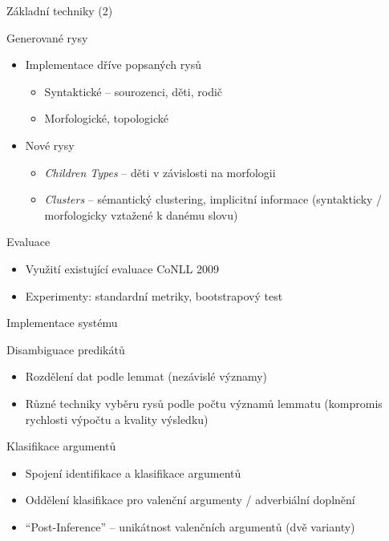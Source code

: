\documentclass[hyperref={unicode=true}]{beamer}
\begin{document}
\begin{frame}{Základní techniky (2)}
    \begin{block}{Generované rysy}
    \begin{itemize}
        \item Implementace dříve popsaných rysů
        \begin{itemize}
            \item Syntaktické -- sourozenci, děti, rodič
            \item Morfologické, topologické
        \end{itemize}
        \item Nové rysy
        \begin{itemize}
            \item \emph{Children Types} -- děti v závislosti na morfologii
            \item \emph{Clusters} -- sémantický clustering, implicitní informace (syntakticky / morfologicky vztažené k danému slovu)
        \end{itemize}
    \end{itemize}
    \end{block}

    \begin{block}{Evaluace}
    \begin{itemize}
        \item Využití existující evaluace CoNLL 2009
        \item Experimenty: standardní metriky, bootstrapový test
    \end{itemize}
    \end{block}
\end{frame}

\begin{frame}{Implementace systému}
    \begin{block}{Disambiguace predikátů}
    \begin{itemize}
        \item Rozdělení dat podle lemmat (nezávislé významy)
        \item Různé techniky vyběru rysů podle počtu významů lemmatu (kompromis rychlosti výpočtu a kvality výsledku)
    \end{itemize}
    \end{block}

    \begin{block}{Klasifikace argumentů}
    \begin{itemize}
        \item Spojení identifikace a klasifikace argumentů
        \item Oddělení klasifikace pro valenční argumenty / adverbiální doplnění
        \item "`Post-Inference"' -- unikátnost valenčních argumentů (dvě varianty)
    \end{itemize}
    \end{block}
\end{frame}
\end{document}
